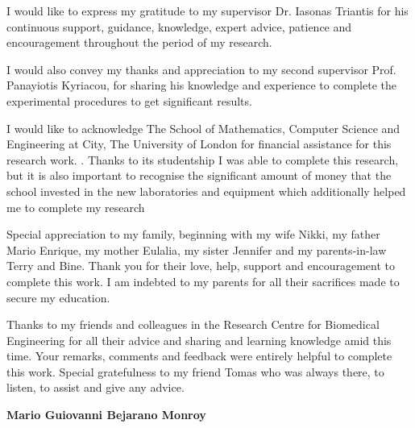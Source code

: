
\begin{acknowledgements}      
I would like to express my gratitude to my supervisor Dr. Iasonas Triantis for his continuous support, guidance, knowledge, expert advice, patience and encouragement throughout the period   of my research.

I would also convey  my thanks and appreciation to my second supervisor Prof. Panayiotis Kyriacou, for sharing his knowledge and experience to complete the experimental procedures  to get  significant results.

I would like to acknowledge The School of Mathematics, Computer Science and Engineering at City, The University of London for financial assistance for this research work. . Thanks to its studentship I was able to complete this research, but it is also important to recognise the significant amount  of money that the school invested in the new laboratories and equipment which additionally helped me to complete my research  

Special appreciation  to my family, beginning  with my wife Nikki, my father Mario Enrique, my mother Eulalia, my sister Jennifer and my parents-in-law Terry and Bine. Thank you for their love, help, support and encouragement to complete this work. I am indebted to my parents for all their sacrifices made to secure my education.

Thanks to my friends and colleagues in the Research Centre for Biomedical Engineering for all their advice and sharing and learning knowledge amid  this time. Your remarks, comments and feedback were entirely helpful to complete this work. Special gratefulness  to my friend Tomas who was always there, to listen, to assist and give  any advice.

\begin{flushright}
	\textbf{Mario Guiovanni Bejarano Monroy}
\end{flushright}


\end{acknowledgements}
